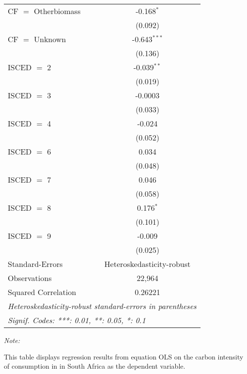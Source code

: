 \begin{table}[htbp!]
\begin{adjustbox}{width = 1\textwidth, max height = 0.95\textheight, center}
\begin{threeparttable}[b]
\begin{tabular}{lc}
            CF $=$ Otherbiomass & -0.168$^{*}$\\   
                                & (0.092)\\   
            CF $=$ Unknown      & -0.643$^{***}$\\   
                                & (0.136)\\   
            ISCED $=$ 2         & -0.039$^{**}$\\   
                                & (0.019)\\   
            ISCED $=$ 3         & -0.0003\\   
                                & (0.033)\\   
            ISCED $=$ 4         & -0.024\\   
                                & (0.052)\\   
            ISCED $=$ 6         & 0.034\\   
                                & (0.048)\\   
            ISCED $=$ 7         & 0.046\\   
                                & (0.058)\\   
            ISCED $=$ 8         & 0.176$^{*}$\\   
                                & (0.101)\\   
            ISCED $=$ 9         & -0.009\\   
                                & (0.025)\\   
            \midrule 
            Standard-Errors     & Heteroskedasticity-robust \\   
            Observations        & 22,964\\  
            Squared Correlation & 0.26221\\  
            \midrule \midrule
            \multicolumn{2}{l}{\emph{Heteroskedasticity-robust standard-errors in parentheses}}\\
            \multicolumn{2}{l}{\emph{Signif. Codes: ***: 0.01, **: 0.05, *: 0.1}}\\
         \end{tabular}
         
         \begin{tablenotes}\item \medskip \textit{Note:}
            \item This table displays regression results from equation OLS on the carbon intensity of consumption in  in South Africa as the dependent variable. 
         \end{tablenotes}
      \end{threeparttable}
   \end{adjustbox}
\end{table}


